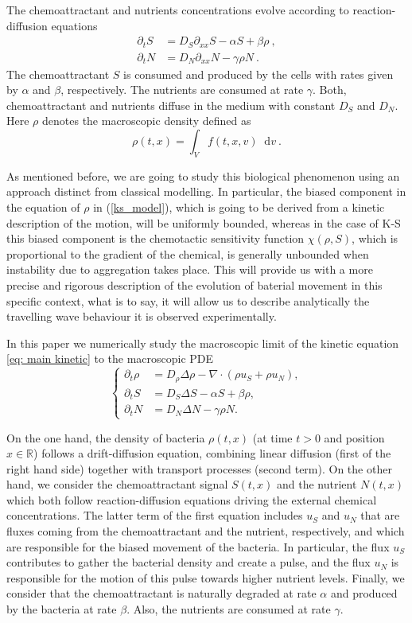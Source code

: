 \documentclass[11pt,twoside]{article}
\numberwithin{equation}{section}
\newcommand*\diff{\mathop{}\!\mathrm{d}}
\theoremstyle{plain}
\theoremstyle{nonumberplain}
\begin{document}
 


The chemoattractant and nutrients concentrations evolve according to  reaction-diffusion equations
\begin{align}
    \partial_t S&=D_S\partial_{xx}S-\alpha S+\beta \rho\ ,\\
    \partial_t N&=D_N\partial_{xx}N-\gamma\rho N\ .
\end{align}
The chemoattractant $S$ is consumed and produced by the cells with rates given by $\alpha$ and $\beta$, respectively. The nutrients are consumed at rate $\gamma$. Both, chemoattractant and nutrients diffuse in the medium with constant $D_S$ and $D_N$. Here $\rho$ denotes the macroscopic density defined as
\[
\rho(t,x)=\int_Vf(t,x,v)\diff v\ .
\]

As mentioned before, we are going to study this biological phenomenon using an approach distinct from classical modelling. In particular, the biased component in the equation of $\rho$ in (\ref{ks_model}), which is going to be derived from a kinetic description of the motion, will be uniformly bounded, whereas in the case of K-S this biased component is the chemotactic sensitivity function $\chi(\rho, S)$, which is proportional to the gradient of the chemical, is generally unbounded when instability due to aggregation takes place. This will provide us with a more precise and rigorous description of the evolution of baterial movement in this specific context, what is to say, it will allow us to describe analytically the travelling wave behaviour it is observed experimentally.

In this paper we numerically study the macroscopic limit of the kinetic equation \eqref{eq: main kinetic} to the macroscopic PDE
\begin{equation}
  \left \{
    \begin{aligned}
       \partial_t \rho &= D_\rho \Delta \rho - \nabla \cdot (\rho u_S + \rho u_N),\\
       \partial_t S &= D_S \Delta S - \alpha S + \beta \rho,\\
        \partial_t N &= D_N \Delta N - \gamma \rho N.
    \end{aligned}
  \right .
  \label{basicmodel}
\end{equation}

On the one hand, the density of bacteria $\rho(t, x)$ (at time $t>0$ and position $x \in \mathbb{R} $) follows a drift-diffusion equation, combining linear diffusion (first of the right hand side) together with transport processes (second term). On the other hand, we consider the chemoattractant signal $S(t,x)$ and the nutrient $N(t,x)$ which both follow reaction-diffusion equations driving the external chemical concentrations. The latter term of the first equation includes $u_S$ and $u_N$ that are fluxes coming from the chemoattractant and the nutrient, respectively, and which are responsible for the biased movement of the bacteria. In particular, the flux $u_S$ contributes to gather the bacterial density and create a pulse, and the flux $u_N$ is responsible for the motion of this pulse towards higher nutrient levels.
Finally, we consider that the chemoattractant is naturally degraded at rate $\alpha$ and produced by the bacteria at rate $\beta$. Also, the nutrients are consumed at rate $\gamma$. 
\end{document}
